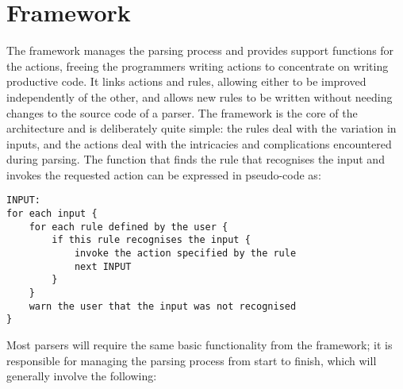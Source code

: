 \section{Framework}

\label{framework in architecture}

The framework manages the parsing process and provides support functions
for the actions, freeing the programmers writing actions to concentrate on
writing productive code.  It links actions and rules, allowing either to be
improved independently of the other, and allows new rules to be written
without needing changes to the source code of a parser.  The framework is
the core of the architecture and is deliberately quite simple: the rules
deal with the variation in inputs, and the actions deal with the
intricacies and complications encountered during parsing.  The function
that finds the rule that recognises the input and invokes the requested
action can be expressed in pseudo-code as:

\begin{verbatim}
INPUT:
for each input {
    for each rule defined by the user {
        if this rule recognises the input {
            invoke the action specified by the rule
            next INPUT
        }
    }
    warn the user that the input was not recognised
}
\end{verbatim}

Most parsers will require the same basic functionality from the framework;
it is responsible for managing the parsing process from start to finish,
which will generally involve the following:

